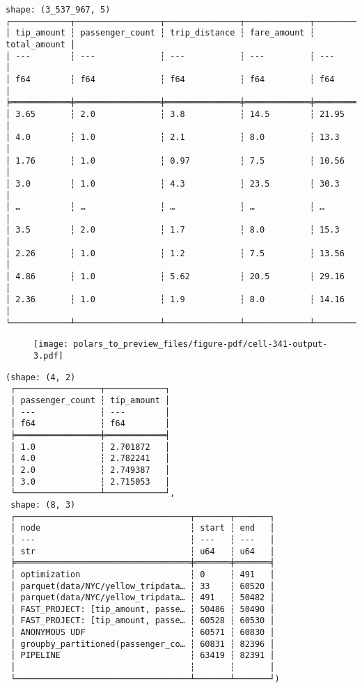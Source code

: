 \documentclass[
  letterpaper,
  DIV=11,
  numbers=noendperiod]{scrartcl}
\begin{document}
\begin{verbatim}
shape: (3_537_967, 5)
┌────────────┬─────────────────┬───────────────┬─────────────┬──────────────┐
│ tip_amount ┆ passenger_count ┆ trip_distance ┆ fare_amount ┆ total_amount │
│ ---        ┆ ---             ┆ ---           ┆ ---         ┆ ---          │
│ f64        ┆ f64             ┆ f64           ┆ f64         ┆ f64          │
╞════════════╪═════════════════╪═══════════════╪═════════════╪══════════════╡
│ 3.65       ┆ 2.0             ┆ 3.8           ┆ 14.5        ┆ 21.95        │
│ 4.0        ┆ 1.0             ┆ 2.1           ┆ 8.0         ┆ 13.3         │
│ 1.76       ┆ 1.0             ┆ 0.97          ┆ 7.5         ┆ 10.56        │
│ 3.0        ┆ 1.0             ┆ 4.3           ┆ 23.5        ┆ 30.3         │
│ …          ┆ …               ┆ …             ┆ …           ┆ …            │
│ 3.5        ┆ 2.0             ┆ 1.7           ┆ 8.0         ┆ 15.3         │
│ 2.26       ┆ 1.0             ┆ 1.2           ┆ 7.5         ┆ 13.56        │
│ 4.86       ┆ 1.0             ┆ 5.62          ┆ 20.5        ┆ 29.16        │
│ 2.36       ┆ 1.0             ┆ 1.9           ┆ 8.0         ┆ 14.16        │
└────────────┴─────────────────┴───────────────┴─────────────┴──────────────┘
\end{verbatim}

\begin{figure}[H]

{\centering \texttt{[image: polars\_to\_preview\_files/figure-pdf/cell-341-output-3.pdf]}

}

\end{figure}

\begin{verbatim}
(shape: (4, 2)
 ┌─────────────────┬────────────┐
 │ passenger_count ┆ tip_amount │
 │ ---             ┆ ---        │
 │ f64             ┆ f64        │
 ╞═════════════════╪════════════╡
 │ 1.0             ┆ 2.701872   │
 │ 4.0             ┆ 2.782241   │
 │ 2.0             ┆ 2.749387   │
 │ 3.0             ┆ 2.715053   │
 └─────────────────┴────────────┘,
 shape: (8, 3)
 ┌───────────────────────────────────┬───────┬───────┐
 │ node                              ┆ start ┆ end   │
 │ ---                               ┆ ---   ┆ ---   │
 │ str                               ┆ u64   ┆ u64   │
 ╞═══════════════════════════════════╪═══════╪═══════╡
 │ optimization                      ┆ 0     ┆ 491   │
 │ parquet(data/NYC/yellow_tripdata… ┆ 33    ┆ 60520 │
 │ parquet(data/NYC/yellow_tripdata… ┆ 491   ┆ 50482 │
 │ FAST_PROJECT: [tip_amount, passe… ┆ 50486 ┆ 50490 │
 │ FAST_PROJECT: [tip_amount, passe… ┆ 60528 ┆ 60530 │
 │ ANONYMOUS UDF                     ┆ 60571 ┆ 60830 │
 │ groupby_partitioned(passenger_co… ┆ 60831 ┆ 82396 │
 │ PIPELINE                          ┆ 63419 ┆ 82391 │
 │                                   ┆       ┆       │
 └───────────────────────────────────┴───────┴───────┘)
\end{verbatim}
\end{document}
